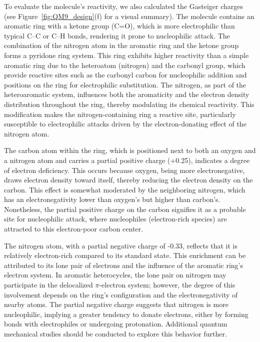 To evaluate the molecule’s reactivity, we also calculated the Gasteiger charges~\cite{Gasteiger1980IterativeCharges} (see Figure~\ref{fig:QM9_design}(f) for a visual summary). The molecule contains an aromatic ring with a ketone group (C=O), which is more electrophilic than typical C–C or C–H bonds, rendering it prone to nucleophilic attack. The combination of the nitrogen atom in the aromatic ring and the ketone group forms a pyridone ring system. This ring exhibits higher reactivity than a simple aromatic ring due to the heteroatom (nitrogen) and the carbonyl group, which provide reactive sites such as the carbonyl carbon for nucleophilic addition and positions on the ring for electrophilic substitution. The nitrogen, as part of the heteroaromatic system, influences both the aromaticity and the electron density distribution throughout the ring, thereby modulating its chemical reactivity. This modification makes the nitrogen-containing ring a reactive site, particularly susceptible to electrophilic attacks driven by the electron-donating effect of the nitrogen atom.

The carbon atom within the ring, which is positioned next to both an oxygen and a nitrogen atom and carries a partial positive charge (+0.25), indicates a degree of electron deficiency. This occurs because oxygen, being more electronegative, draws electron density toward itself, thereby reducing the electron density on the carbon. This effect is somewhat moderated by the neighboring nitrogen, which has an electronegativity lower than oxygen’s but higher than carbon’s. Nonetheless, the partial positive charge on the carbon signifies it as a probable site for nucleophilic attack, where nucleophiles (electron-rich species) are attracted to this electron-poor carbon center.

The nitrogen atom, with a partial negative charge of -0.33, reflects that it is relatively electron-rich compared to its standard state. This enrichment can be attributed to its lone pair of electrons and the influence of the aromatic ring’s electron system. In aromatic heterocycles, the lone pair on nitrogen may participate in the delocalized $\pi$-electron system; however, the degree of this involvement depends on the ring’s configuration and the electronegativity of nearby atoms. The partial negative charge suggests that nitrogen is more nucleophilic, implying a greater tendency to donate electrons, either by forming bonds with electrophiles or undergoing protonation. Additional quantum mechanical studies should be conducted to explore this behavior further.

